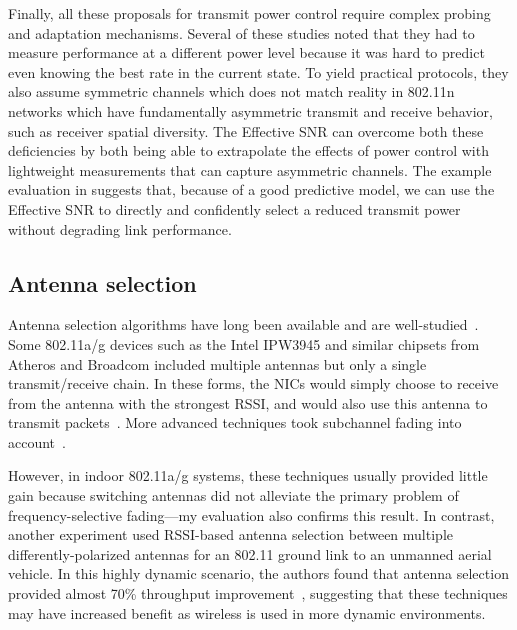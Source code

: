 Finally, all these proposals for transmit power control require complex probing and adaptation mechanisms. Several of these studies noted that they had to measure performance at a different power level because it was hard to predict even knowing the best rate in the current state. To yield practical protocols, they also assume symmetric channels which does not match reality in 802.11n networks which have fundamentally asymmetric transmit and receive behavior, such as receiver spatial diversity. The Effective SNR can overcome both these deficiencies by both being able to extrapolate the effects of power control with lightweight measurements that can capture asymmetric channels. The example evaluation in  suggests that, because of a good predictive model, we can use the Effective SNR to directly and confidently select a reduced transmit power without degrading link performance.

\subsection{Antenna selection}
Antenna selection algorithms have long been available and are well-studied~\cite{Tse}. Some 802.11a/g devices such as the Intel IPW3945 and similar chipsets from Atheros and Broadcom included multiple antennas but only a single transmit/receive chain. In these forms, the NICs would simply choose to receive from the antenna with the strongest RSSI, and would also use this antenna to transmit packets~\cite{Broadcom_MIMOChip,Cheng_AntSel}. More advanced techniques took subchannel fading into account~\cite{Zhang_AntSel}.

However, in indoor 802.11a/g systems, these techniques usually provided little gain because switching antennas did not alleviate the primary problem of frequency-selective fading---my evaluation also confirms this result. In contrast, another experiment used RSSI-based antenna selection between multiple differently-polarized antennas for an 802.11 ground link to an unmanned aerial vehicle. In this highly dynamic scenario, the authors found that antenna selection provided almost 70\% throughput improvement~\cite{Vlah_UAV}, suggesting that these techniques may have increased benefit as wireless is used in more dynamic environments.

